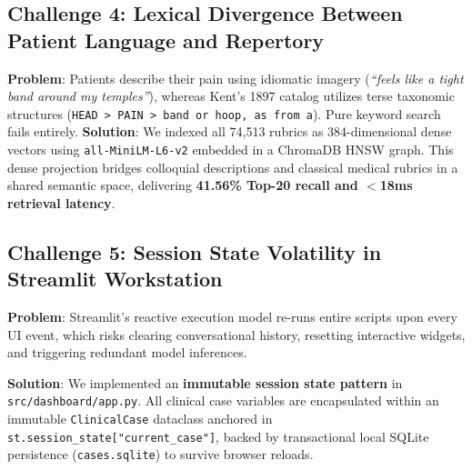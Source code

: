 \subsection{Challenge 4: Lexical Divergence Between Patient Language and Repertory}
\textbf{Problem}: Patients describe their pain using idiomatic imagery (\textit{``feels like a tight band around my temples''}), whereas Kent's 1897 catalog utilizes terse taxonomic structures (\texttt{HEAD > PAIN > band or hoop, as from a}). Pure keyword search fails entirely.  
\textbf{Solution}: We indexed all 74,513 rubrics as 384-dimensional dense vectors using \texttt{all-MiniLM-L6-v2} embedded in a ChromaDB HNSW graph. This dense projection bridges colloquial descriptions and classical medical rubrics in a shared semantic space, delivering \textbf{41.56\% Top-20 recall and $<$18ms retrieval latency}.

\subsection{Challenge 5: Session State Volatility in Streamlit Workstation}
{\raggedright
\textbf{Problem}: Streamlit's reactive execution model re-runs entire scripts upon every UI event, which risks clearing conversational history, resetting interactive widgets, and triggering redundant model inferences.\par
\textbf{Solution}: We implemented an \textbf{immutable session state pattern} in \texttt{src/dashboard/app.py}. All clinical case variables are encapsulated within an immutable \texttt{ClinicalCase} dataclass anchored in \texttt{st.session\_state["current\_case"]}, backed by transactional local SQLite persistence (\texttt{cases.sqlite}) to survive browser reloads.\par
}
